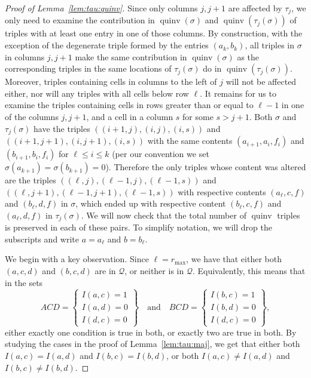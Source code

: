 \documentclass[ALCO,Unicode]{cedram}
\DeclareMathOperator{\quinv}{quinv}
\newcommand{\cQ}{\mathcal{Q}}
\begin{document}
\begin{proof}[Proof of Lemma~\ref{lem:tau:quinv}]
Since only columns $j,j+1$ are affected by $\tau_j$, we only need to examine the contribution in $\quinv(\sigma)$ and $\quinv(\tau_j(\sigma))$ of triples with at least one entry in one of those columns. By construction, with the exception of the degenerate triple formed by the entries $(a_k,b_k)$, all triples in $\sigma$ in columns $j,j+1$ make the same contribution in $\quinv(\sigma)$ as the corresponding triples in the same locations of $\tau_j(\sigma)$ do in $\quinv(\tau_j(\sigma))$. Moreover, triples containing cells in columns to the left of $j$ will not be affected either, nor will any triples with all cells below row $\ell$. It remains for us to examine the triples containing cells in rows greater than or equal to $\ell-1$ in one of the columns $j,j+1$, and a cell in a column $s$ for some $s>j+1$. Both $\sigma$ and $\tau_j(\sigma)$ have the triples $((i+1,j),(i,j),(i,s))$ and $((i+1,j+1),(i,j+1),(i,s))$ with the same contents $(a_{i+1},a_i,f_i)$ and $(b_{i+1},b_i,f_i)$ for $\ell\leq i \leq k$ (per our convention we set $\sigma(a_{k+1})=\sigma(b_{k+1})=0$). Therefore the only triples whose content was altered are the triples $((\ell,j),(\ell-1,j),(\ell-1,s))$ and $((\ell,j+1),(\ell-1,j+1),(\ell-1,s))$ with respective contents $(a_{\ell},c,f)$ and $(b_{\ell},d,f)$ in $\sigma$, which ended up with respective content $(b_{\ell},c,f)$ and $(a_{\ell},d,f)$ in $\tau_j(\sigma)$. We will now check that the total number of $\quinv$ triples is preserved in each of these pairs. To simplify notation, we will drop the subscripts and write $a=a_{\ell}$ and $b=b_{\ell}$.


We begin with a key observation. Since $\ell=r_{\max}$, we have that either both $(a,c,d)$ and $(b,c,d)$ are in $\cQ$, or neither is in $\cQ$. Equivalently, this means that in the sets
\[ 
ACD = \left\{\begin{matrix}I(a,c)=1\\I(a,d)=0\\I(d,c)=0 \end{matrix} \right\} 
\quad \mbox{and} \quad 
BCD = \left\{\begin{matrix}I(b,c)=1\\I(b,d)=0\\I(d,c)=0 \end{matrix} \right\},
\]
either exactly one condition is true in both, or exactly two are true in both. By studying the cases in the proof of Lemma~\ref{lem:tau:maj}, we get that either both $I(a,c)=I(a,d)$ and $I(b,c)=I(b,d)$, or both $I(a,c)\neq I(a,d)$ and $I(b,c)\neq I(b,d)$. 


\end{proof}
\end{document}
